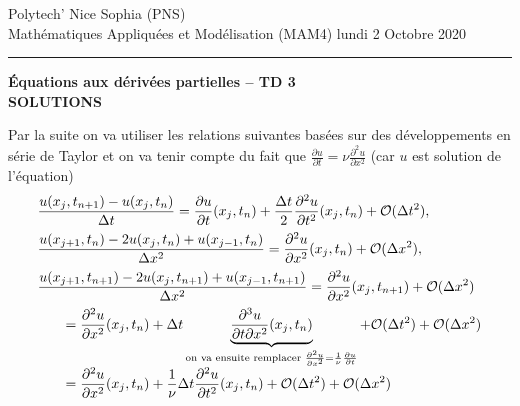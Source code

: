 \documentclass[12pt,a4paper]{article}
\begin{document}
 \hfill Polytech' Nice Sophia (PNS)\\
\noindent Math\'ematiques Appliqu\'ees et Mod\'elisation (MAM4) \hfill lundi 2 Octobre 2020 \\

\hrule

\bigskip
\bigskip

\begin{center}{\bf \'Equations aux d\'eriv\'ees partielles --
TD 3\\ SOLUTIONS}\end{center}

\bigskip


\noindent Par la suite on va utiliser les relations suivantes
bas\'ees sur des d\'eveloppements en s\'erie de Taylor et on va tenir compte du fait que $\frac{\partial u}{\partial t} = \nu
\frac{\partial^2 u}{\partial x^2}$ (car $u$ est solution de l'\'equation)
\begin{equation}\label{eq:util}
\begin{array}{l}
\displaystyle \frac{u(x_j,t_{n+1})-u(x_j,t_n)}{\Delta t}  = 
\displaystyle\frac{\partial u}{\partial t}(x_j,t_n) + \frac{\Delta t}{2}
\frac{\partial^2 u}{\partial t^2}(x_j,t_n)+{\cal O}(\Delta t^2),\\[2ex]
\displaystyle \frac{u(x_{j+1},t_n)-2u(x_j,t_n)+u(x_{j-1},t_n)}{\Delta
  x^2}  = \displaystyle\frac{\partial^2 u}{\partial
  x^2}(x_j,t_n)+{\cal O}(\Delta x^2),\\[2ex]
\displaystyle \frac{u(x_{j+1},t_{n+1})-2u(x_j,t_{n+1})+u(x_{j-1},t_{n+1})}{\Delta
  x^2}  = \displaystyle  \displaystyle\frac{\partial^2 u}{\partial
  x^2}(x_j,t_{n+1})+{\cal O}(\Delta x^2)\\[2ex]
\qquad = \displaystyle \frac{\partial^2 u}{\partial
  x^2}(x_j,t_n)+  \Delta t \underbrace{\frac{\partial^3 u}{\partial t\partial
  x^2}(x_j,t_n)}_{\text{on va ensuite remplacer }\frac{\partial^2 u}{\partial x^2} = \frac{1}{\nu} \frac{\partial u}{\partial t}}+{\cal O}(\Delta t^2) + {\cal O}(\Delta x^2)\\[2ex]
\qquad = \displaystyle \frac{\partial^2 u}{\partial
  x^2}(x_j,t_n)+  \frac{1}{\nu} \Delta t \frac{\partial^2 u}{\partial
  t^2}(x_j,t_n)+{\cal O}(\Delta t^2) + {\cal O}(\Delta x^2)
\end{array}
\end{equation}
\end{document}
